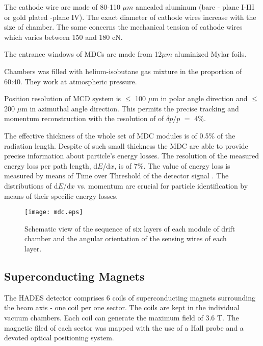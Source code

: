 The cathode wire are made of 80-110 $\mu m$ annealed aluminum 
(bare - plane I-III or gold plated -plane IV). 
The exact diameter of cathode wires increase with the size of chamber.
The same concerns the mechanical tension of cathode wires which varies between 150 and 180 cN.

The entrance windows of  MDCs are made from 12$\mu m$ aluminized Mylar foils.

Chambers was filled with helium-isobutane gas mixture in the proportion of 60:40. They work at atmospheric pressure.  

Position resolution of MCD system is $\le$ 100 $\mu$m in polar angle direction and $\le$ 200 $\mu$m 
in azimuthal angle direction. This permits the precise tracking and momentum reconstruction 
with the resolution of of $\delta{p}/p$ $=$ 4\%.

The effective thickness of the whole set of MDC modules is of 0.5\% of the radiation length. 
Despite of such small thickness the MDC are able to provide precise information 
about particle's energy losses. The resolution of the measured energy loss per path length, 
d$E$/d$x$, is of 7\%. The value of energy loss is measured by means of Time over Threshold 
of the detector signal \cite{Kipnis}. 
The distributions of d$E$/d$x$ vs. momentum are crucial for particle identification by means 
of their specific energy losses.

\begin{figure}
	\centering
	\texttt{[image: mdc.eps]}
	\caption{Schematic view of the sequence of six layers of each module of drift chamber 
	and the angular orientation of the sensing wires of each layer.}
	\label{mdc}
\end{figure}

\subsection{Superconducting Magnets}

The HADES detector comprises 6 coils of superconducting magnets surrounding 
the beam axis - one coil per one sector. The coils are kept in the individual vacuum chambers. 
Each coil can generate the maximum field of 3.6 T. 
The magnetic filed of each sector was mapped with the use of a Hall probe 
and a devoted optical positioning system. 

